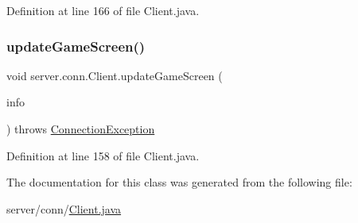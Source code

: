 Definition at line 166 of file Client.\+java.

\hypertarget{classserver_1_1conn_1_1_client_a08ac64f27ada096677c9635d530ed39d}{}\label{classserver_1_1conn_1_1_client_a08ac64f27ada096677c9635d530ed39d} 
\subsubsection{\texorpdfstring{update\+Game\+Screen()}{updateGameScreen()}}
{\footnotesize\ttfamily void server.\+conn.\+Client.\+update\+Game\+Screen (\begin{DoxyParamCaption}\item[{\hyperlink{classsharedlib_1_1tuples_1_1_game_screen_info}{Game\+Screen\+Info}}]{info }\end{DoxyParamCaption}) throws \hyperlink{classsharedlib_1_1exceptions_1_1_connection_exception}{Connection\+Exception}}



Definition at line 158 of file Client.\+java.



The documentation for this class was generated from the following file\+:\begin{DoxyCompactItemize}
\item 
server/conn/\hyperlink{_client_8java}{Client.\+java}\end{DoxyCompactItemize}
